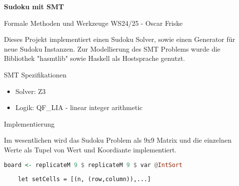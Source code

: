 

\usepackage{listings}



\begin{Large}
    \textsf{\textbf{Sudoku mit SMT}}

    Formale Methoden und Werkzeuge WS24/25 - Oscar Friske
\end{Large}
\vspace{2ex}

Dieses Projekt implementiert einen Sudoku Solver, sowie einen Generator für neue Sudoku Instanzen. Zur Modellierung des SMT Problems wurde die Bibliothek "hasmtlib" sowie Haskell als Hostsprache genutzt.

\vspace{2ex}

\begin{Large}
    SMT Spezifikationen
\end{Large}
\begin{itemize}
  \item Solver: Z3
  \item Logik: QF\_LIA - linear integer arithmetic
\end{itemize}
\vspace{2ex}

\begin{Large}
    Implementierung
\end{Large}
\vspace{2ex}

Im wesentlichen wird das Sudoku Problem als 9x9 Matrix und die einzelnen Werte als Tupel von Wert und Koordiante implementiert.
\begin{lstlisting}[language=Haskell]
    board <- replicateM 9 $ replicateM 9 $ var @IntSort
\end{lstlisting}
\begin{lstlisting}
    let setCells = [(n, (row,column)),...]
\end{lstlisting}

